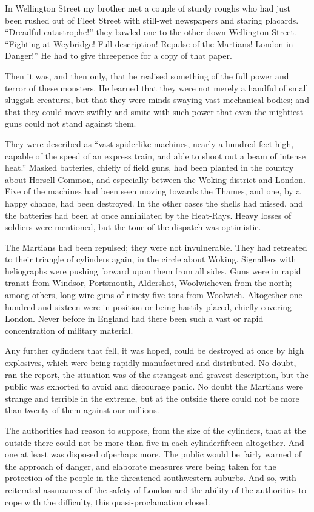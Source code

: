 In Wellington Street my brother met a couple of sturdy roughs who
had just been rushed out of Fleet Street with still-wet newspapers
and staring placards. ``Dreadful catastrophe!'' they bawled one to
the other down Wellington Street. ``Fighting at Weybridge! Full
description! Repulse of the Martians! London in Danger!'' He had to
give threepence for a copy of that paper.

Then it was, and then only, that he realised something of the full
power and terror of these monsters. He learned that they were not
merely a handful of small sluggish creatures, but that they were
minds swaying vast mechanical bodies; and that they could move
swiftly and smite with such power that even the mightiest guns
could not stand against them.

They were described as ``vast spiderlike machines, nearly a hundred
feet high, capable of the speed of an express train, and able to
shoot out a beam of intense heat.'' Masked batteries, chiefly of
field guns, had been planted in the country about Horsell Common,
and especially between the Woking district and London. Five of the
machines had been seen moving towards the Thames, and one, by a
happy chance, had been destroyed. In the other cases the shells had
missed, and the batteries had been at once annihilated by the
Heat-Rays. Heavy losses of soldiers were mentioned, but the tone of
the dispatch was optimistic.

The Martians had been repulsed; they were not invulnerable. They
had retreated to their triangle of cylinders again, in the circle
about Woking. Signallers with heliographs were pushing forward upon
them from all sides. Guns were in rapid transit from Windsor,
Portsmouth, Aldershot, Woolwich\dash{}even from the north; among others,
long wire-guns of ninety-five tons from Woolwich. Altogether one
hundred and sixteen were in position or being hastily placed,
chiefly covering London. Never before in England had there been
such a vast or rapid concentration of military material.

Any further cylinders that fell, it was hoped, could be destroyed
at once by high explosives, which were being rapidly manufactured
and distributed. No doubt, ran the report, the situation was of the
strangest and gravest description, but the public was exhorted to
avoid and discourage panic. No doubt the Martians were strange and
terrible in the extreme, but at the outside there could not be more
than twenty of them against our millions.

The authorities had reason to suppose, from the size of the
cylinders, that at the outside there could not be more than five in
each cylinder\dash{}fifteen altogether. And one at least was disposed
of\dash{}perhaps more. The public would be fairly warned of the approach
of danger, and elaborate measures were being taken for the
protection of the people in the threatened southwestern suburbs.
And so, with reiterated assurances of the safety of London and the
ability of the authorities to cope with the difficulty, this
quasi-proclamation closed.

